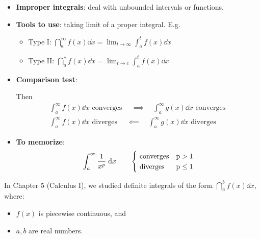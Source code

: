 \begin{tcolorbox}
    \begin{itemize}
        \item \textbf{Improper integrals}: deal with unbounded intervals or functions.
        \item \textbf{Tools to use}: taking limit of a proper integral. E.g.
        \begin{itemize}
            \item Type I: $\dint_a^\infty f(x) \dd x = \lim_{t \to \infty} \int_a^t f(x) \dd x$
            \item Type II: $\dint_a^c f(x) \dd x = \lim_{t \to c} \int_a^t f(x) \dd x$
        \end{itemize}
        \item \textbf{Comparison test}:  
        Then 
        \begin{align*}
        \int_a^\infty f(x) \dd x \text{ converges } \quad \boldsymbol{\implies} \quad \int_a^\infty g(x) \dd x \text{ converges } \\
        \int_a^\infty f(x) \dd x \text{ diverges } \quad \boldsymbol{\impliedby} \quad \int_a^\infty g(x) \dd x \text{ diverges } 
    \end{align*}
    \item \textbf{To memorize}: \begin{align*}
        \int_a^\infty \dfrac{1}{x^p} \;\mathrm{d} x \qquad \begin{cases}
            \text{ converges} & \text p > 1\\
            \text{ diverges} & \text p \leq 1
        \end{cases}
    \end{align*}
    \end{itemize}
\end{tcolorbox}


In Chapter 5 (Calculus I), we studied definite integrals of the form $\dint_a^b f(x) \dd x$, where:

\begin{itemize}
    \item $f(x)$ is piecewise continuous, and
    \item $a,b$ are real numbers.
\end{itemize}

